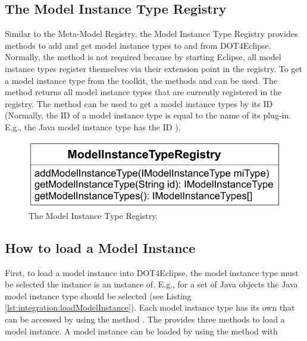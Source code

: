\subsection{The Model Instance Type Registry}

Similar to the Meta-Model Registry, the Model Instance Type Registry provides methods to add and get model instance types to and from \acl{DOT4Eclipse}. Normally, the method  is not required because by starting Eclipse, all model instance types register themselves via their extension point in the registry. To get a model instance type from the toolkit, the methods  and  can be used. The method  returns all model instance types that are currently registered in the registry. The method  can be used to get a model instance types by its ID (Normally, the ID of a model instance type is equal to the name of its plug-in. E.g., the Java model instance type has the ID ).

\begin{figure}[!b]
	\centering
	\includegraphics[width=.7\linewidth]{figures/integration/modelInstanceTypeRegistry}
	\caption{The Model Instance Type Registry.}
	\label{pic:integration:modelInstanceTypeRegistry}
\end{figure}


\subsection{How to load a Model Instance}

First, to load a model instance into \acl{DOT4Eclipse}, the model instance type must be selected the instance is an instance of. E.g., for a set of Java objects the Java model instance type should be selected (see Listing \ref{lst:integration:loadModelInstance}). Each model instance type has its own  that can be accessed by using the method . The  provides three methods to load a model instance. A model instance can be loaded by using the method  with

